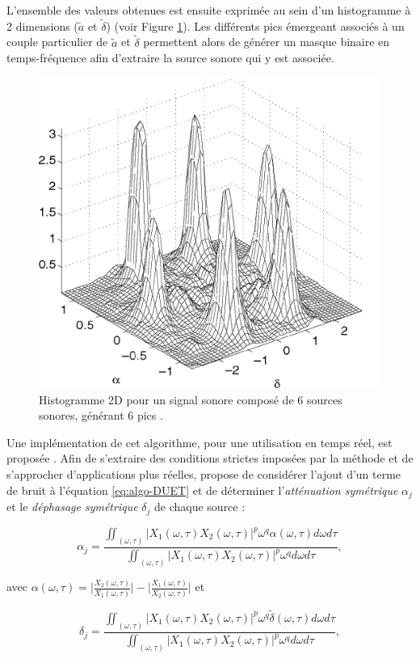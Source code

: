 L'ensemble des valeurs obtenues est ensuite exprimée au sein d'un histogramme à 2 dimensions ($\tilde{a}$ et $\tilde{\delta}$) (voir Figure \ref{fig:DUET_hist}).
Les différents pics émergeant associés à un couple particulier de $\tilde{a}$ et $\tilde{\delta}$ permettent alors de générer un masque binaire en temps-fréquence afin d'extraire la source sonore qui y est associée.

\begin{figure}[t]
\centering
\includegraphics[width = 0.6\linewidth]{./figures/autres/DUET_histogram.png}
\caption{Histogramme 2D pour un signal sonore composé de 6 sources sonores, générant 6 pics \cite{yilmaz2004blind}.}
\label{fig:DUET_hist}
\end{figure}

Une implémentation de cet algorithme, pour une utilisation en temps réel, est proposée \cite{rickard2001real}.
Afin de s'extraire des conditions strictes imposées par la méthode et de s'approcher d'applications plus réelles, \cite{rickard2007duet} propose de considérer l'ajout d'un terme de bruit à l'équation \ref{eq:algo-DUET} et de déterminer l'\textit{atténuation symétrique} $\alpha_j$ et le \textit{déphasage symétrique} $\delta_j$ de chaque source :

\begin{equation}
\alpha_j = \frac{\iint_{(\omega,\tau)} \vert X_1(\omega,\tau) X_2(\omega,\tau)\vert ^p \omega^q \alpha(\omega,\tau) d\omega d\tau}{\iint_{(\omega,\tau)}\vert X_1(\omega,\tau) X_2(\omega,\tau)\vert ^p \omega^q d\omega d\tau},
\end{equation}

avec $\alpha(\omega,\tau) = \bigg\vert \frac{X_2(\omega,\tau)}{X_1(\omega,\tau)} \bigg\vert - \bigg\vert  \frac{X_1(\omega,\tau)}{X_2(\omega,\tau)} \bigg\vert$ et

\begin{equation}
\delta_j = \frac{\iint_{(\omega,\tau)} \vert X_1(\omega,\tau) X_2(\omega,\tau)\vert ^p \omega^q \tilde{\delta}(\omega,\tau) d\omega d\tau}{\iint_{(\omega,\tau)}\vert X_1(\omega,\tau) X_2(\omega,\tau)\vert ^p \omega^q d\omega d\tau},
\end{equation}

